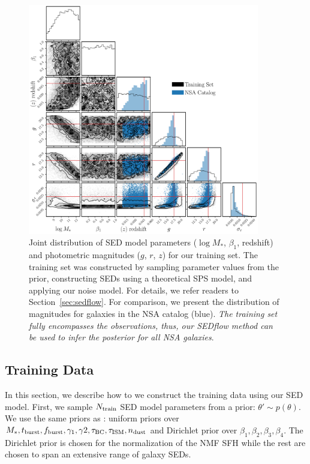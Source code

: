 \begin{figure}
\begin{center}
\includegraphics[width=0.9\textwidth]{figs/training.pdf}
    \caption{\label{fig:data}
    Joint distribution of SED model parameters ($\log M_*$, $\beta_1$,
    redshift) and photometric magnitudes ($g$, $r$, $z$) for our training set.
    The training set was constructed by sampling parameter values from the
    prior, constructing SEDs using a theoretical SPS
    model, and applying our noise model. 
    For details, we refer readers to Section~\ref{sec:sedflow}.
    For comparison, we present the distribution of magnitudes for galaxies in
    the NSA catalog (blue). 
    \emph{The training set fully encompasses the observations, thus, our 
    {\sc SEDflow} method can be used to infer the posterior for all NSA
    galaxies}.
    }
\end{center}
\end{figure}
\subsection{Training Data} \label{sec:training}
In this section, we describe how to we construct the training data using our
SED model.
First, we sample $N_{\rm train}$ SED model parameters from a prior: $\theta'\sim p(\theta)$. 
We use the same priors as : uniform priors over $M_*,
t_{\rm burst}, f_{\rm burst}, \gamma_1, \gamma2, \tau_{\rm BC}, \tau_{\rm ISM},
n_{\rm dust}$ and Dirichlet prior over $\beta_1, \beta_2, \beta_3, \beta_4$. 
The Dirichlet prior is chosen for the normalization of the NMF SFH while the
rest are chosen to span an extensive range of galaxy SEDs. 


